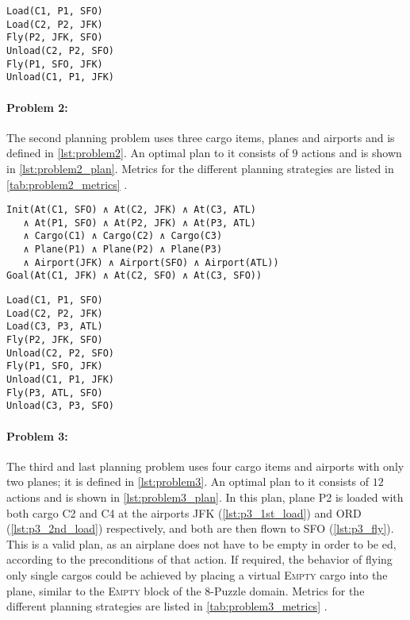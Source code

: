 \documentclass[12pt, a4paper, oneside]{article}
\newcommand{\literal}[1]{{\color{sepia}{\textsc{#1}}}}
\begin{document}
\begin{lstlisting}[caption=Problem 1 optimal plan,label=lst:problem1_plan]
Load(C1, P1, SFO)
Load(C2, P2, JFK)
Fly(P2, JFK, SFO)
Unload(C2, P2, SFO)
Fly(P1, SFO, JFK)
Unload(C1, P1, JFK)
\end{lstlisting}

\paragraph{Problem 2:} The second planning problem uses three cargo items, planes and airports and is defined in \cref{lst:problem2}. An optimal plan to it consists of $9$ actions and is shown in \cref{lst:problem2_plan}.
Metrics for the different planning strategies are listed in \cref{tab:problem2_metrics} .

\begin{lstlisting}[caption=Problem 2 initial state and goal,label=lst:problem2]
Init(At(C1, SFO) ∧ At(C2, JFK) ∧ At(C3, ATL) 
   ∧ At(P1, SFO) ∧ At(P2, JFK) ∧ At(P3, ATL) 
   ∧ Cargo(C1) ∧ Cargo(C2) ∧ Cargo(C3)
   ∧ Plane(P1) ∧ Plane(P2) ∧ Plane(P3)
   ∧ Airport(JFK) ∧ Airport(SFO) ∧ Airport(ATL))
Goal(At(C1, JFK) ∧ At(C2, SFO) ∧ At(C3, SFO))
\end{lstlisting}

\begin{lstlisting}[caption=Problem 2 optimal plan,label=lst:problem2_plan]
Load(C1, P1, SFO)
Load(C2, P2, JFK)
Load(C3, P3, ATL)
Fly(P2, JFK, SFO)
Unload(C2, P2, SFO)
Fly(P1, SFO, JFK)
Unload(C1, P1, JFK)
Fly(P3, ATL, SFO)
Unload(C3, P3, SFO)
\end{lstlisting}

\paragraph{Problem 3:} The third and last planning problem uses four cargo items and airports with only two planes; it is defined in \cref{lst:problem3}. An optimal plan to it consists of $12$ actions and is shown in \cref{lst:problem3_plan}.
In this plan, plane \textsc{P2} is loaded with both cargo \textsc{C2} and \textsc{C4} at
the airports \textsc{JFK} (\cref{lst:p3_1st_load}) and \textsc{ORD} (\cref{lst:p3_2nd_load}) respectively, and both are then flown to \textsc{SFO} (\cref{lst:p3_fly}).
This is a valid plan, as an airplane does not have to be empty in order to be \literal{Load}ed,
according to the preconditions of that action. If required, the behavior of flying
only single cargos could be achieved by placing a virtual \textsc{Empty} cargo into the plane,
similar to the \textsc{Empty} block of the 8-Puzzle domain.
Metrics for the different planning strategies are listed in \cref{tab:problem3_metrics} .
\end{document}
